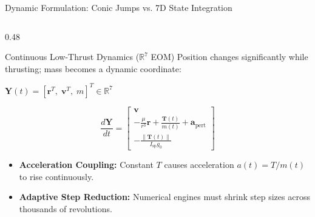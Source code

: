 \documentclass[aspectratio=169, 10pt]{beamer}
\begin{document}
\begin{frame}{Dynamic Formulation: Conic Jumps vs. 7D State Integration}
\begin{columns}[T]
        \begin{column}{0.48\textwidth}
            \begin{exampleblock}{Continuous Low-Thrust Dynamics ($\mathbb{R}^7$ EOM)}
                \scriptsize
                Position changes significantly while thrusting; mass becomes a dynamic coordinate:
                \par\vspace{1pt}
                {\centering $\mathbf{Y}(t) = [\mathbf{r}^T, \; \mathbf{v}^T, \; m]^T \in \mathbb{R}^7$ \par}
                \vspace{-2pt}
                \begin{equation*}
                    \frac{d\mathbf{Y}}{dt} = \begin{bmatrix} 
                        \mathbf{v} \\ 
                        -\frac{\mu}{r^3}\mathbf{r} + \frac{\mathbf{T}(t)}{m(t)} + \mathbf{a}_{\text{pert}} \\ 
                        -\frac{\|\mathbf{T}(t)\|}{I_{\text{sp}} g_0} 
                    \end{bmatrix}
                \end{equation*}
                \begin{itemize}\setlength{\itemsep}{1.2pt}\setlength{\topsep}{0pt}
                    \item \textbf{Acceleration Coupling:} Constant $T$ causes acceleration $a(t) = T/m(t)$ to rise continuously.
                    \item \textbf{Adaptive Step Reduction:} Numerical engines must shrink step sizes across thousands of revolutions.
                \end{itemize}
            \end{exampleblock}
        \end{column}
    \end{columns}
\end{frame}
\end{document}
